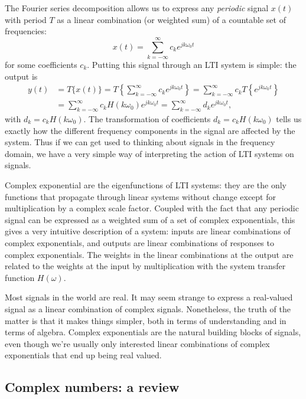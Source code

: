 \documentclass[10pt]{beamer}
\begin{document}
The Fourier series decomposition allows us to express any {\em periodic} signal $x(t)$ with period $T$ as a linear combination (or weighted sum) of a countable set of frequencies:
\begin{equation*}
  x(t) = \sum_{k={-\infty}}^{\infty} c_k e^{j k \omega_0 t}
\end{equation*}
for some coefficients $c_k$.  Putting this signal through an LTI system is simple:  the output is
\begin{align*}
  y(t) &= T \{x(t)\} = T \left\{ \sum_{k={-\infty}}^{\infty} c_k e^{j k \omega_0 t} \right\} 
  = \sum_{k={-\infty}}^{\infty} c_k T \left\{ e^{j k \omega_0 t}  \right\} \\
  &= \sum_{k={-\infty}}^{\infty} c_k H(k \omega_0) e^{j k \omega_0 t}
  = \sum_{k={-\infty}}^{\infty} d_k e^{j k \omega_0 t},
\end{align*}
with $d_k = c_k H(k \omega_0)$.  The transformation of coefficients $d_k = c_k H(k \omega_0)$ tells us exactly how the different frequency components in the signal are affected by the system.  Thus if we can get used to thinking about signals in the frequency domain, we have a very simple way of interpreting the action of LTI systems on signals.

Complex exponential are the eigenfunctions of LTI systems:  they are the only functions that propagate through linear systems without change except for multiplication by a complex scale factor.  Coupled with the fact that any periodic signal can be expressed as a weighted sum of a set of complex exponentials, this gives a very intuitive description of a system:  inputs are linear combinations of complex exponentials, and outputs are linear combinations of responses to complex exponentials.  The weights in the linear combinations at the output are related to the weights at the input by multiplication with the system transfer function $H(\omega)$.

Most signals in the world are real.  It may seem strange to express a real-valued signal as a linear combination of complex signals.  Nonetheless, the truth of the matter is that it makes things simpler, both in terms of understanding and in terms of algebra.  Complex exponentials are the natural building blocks of signals, even though we're usually only interested linear combinations of complex exponentials that end up being real valued.

\subsection{Complex numbers:  a review}
\end{document}
